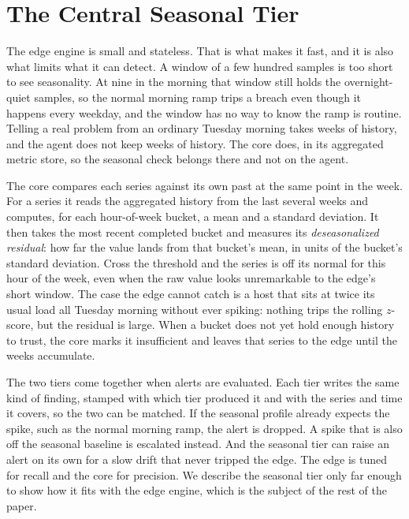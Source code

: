 \section{The Central Seasonal Tier}
\label{sec:seasonal}

The edge engine is small and stateless. That is what makes it fast, and it is also
what limits what it can detect. A window of a few hundred samples is too short to
see seasonality. At nine in the morning that window still holds the overnight-quiet
samples, so the normal morning ramp trips a breach even though it happens every
weekday, and the window has no way to know the ramp is routine. Telling a real
problem from an ordinary Tuesday morning takes weeks of history, and the agent does
not keep weeks of history. The core does, in its aggregated metric store, so the
seasonal check belongs there and not on the agent.

The core compares each series against its own past at the same point in the week.
For a series it reads the aggregated history from the last several weeks and
computes, for each hour-of-week bucket, a mean and a standard deviation. It then
takes the most recent completed bucket and measures its \emph{deseasonalized
residual}: how far the value lands from that bucket's mean, in units of the
bucket's standard deviation. Cross the threshold and the series is off its normal
for this hour of the week, even when the raw value looks unremarkable to the edge's
short window. The case the edge cannot catch is a host that sits at twice its usual
load all Tuesday morning without ever spiking: nothing trips the rolling $z$-score,
but the residual is large. When a bucket does not yet hold enough history to trust,
the core marks it insufficient and leaves that series to the edge until the weeks
accumulate.

The two tiers come together when alerts are evaluated. Each tier writes the same
kind of finding, stamped with which tier produced it and with the series and time
it covers, so the two can be matched. If the seasonal profile already expects the
spike, such as the normal morning ramp, the alert is dropped. A spike that is also off the seasonal baseline is
escalated instead. And the seasonal tier can raise an alert on its own for a slow
drift that never tripped the edge. The edge is tuned for recall and the core for
precision. We describe the seasonal tier only far enough to show how it fits with
the edge engine, which is the subject of the rest of the paper.
